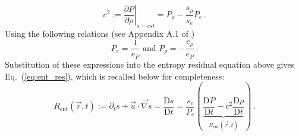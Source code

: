 \documentclass[review,10pt]{elsarticle}
\newcommand{\grad}{\vec{\nabla}}
\newcommand{\resi}{R_\text{ent}}
\newcommand{\resinew}{\widetilde{R}_\text{ent}}
\newcommand{\matder}[1]{\frac{\textrm{D} #1}{\textrm{D} t}}
\newcommand{\eqt}[1]{Eq.~(\ref{#1})}                     %
\begin{document}
%
\begin{equation*}
c^2 := \left. \frac{\partial P}{\partial \rho} \right|_{s=cst} = P_{\rho} - \frac{s_{\rho}}{s_e} P_e   \, .
\end{equation*}
%
Using the following relations (see Appendix A.1 of \cite{jlg})
%
\begin{equation*}
P_e = \frac{1}{e_P} \text{ and } P_{\rho} = -\frac{e_{\rho}}{e_P}  \, .
\end{equation*}
%
Substitution of these expressions into the entropy residual equation above gives \eqt{eq:ent_res}, which is recalled 
below for completeness:
%
\begin{equation*}
\resi(\vec{r},t) := \partial_t s + \vec{u} \cdot \grad s = \matder{s} = \frac{s_e}{P_e} \left( \underbrace{\matder{P} - c^2 \matder{\rho} }_{\resinew(\vec{r},t)} \right) \, .
\end{equation*} 

\newpage
\end{document}
